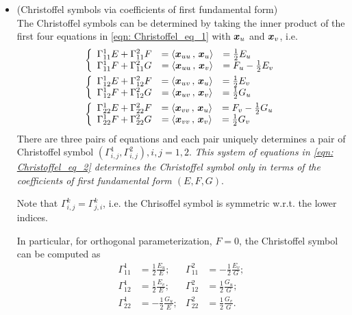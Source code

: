 \documentclass[11pt]{article}
\begin{document}
\begin{itemize}
\item (Christoffel symbols via coefficients of first fundamental form)\\
The Christoffel symbols can be determined by taking the inner product of the first four equations in \eqref{eqn: Christoffel_eq_1} with $\boldsymbol{x}_{u}$ and $\boldsymbol{x}_{v}$, i.e. 
\begin{align}
&\left\{ \begin{array}{ccl}
\Gamma_{11}^{1}E + \Gamma_{11}^{2}F &= \left\langle \boldsymbol{x}_{uu}\,,\, \boldsymbol{x}_{u} \right\rangle &= \frac{1}{2}E_{u} \\ 
\Gamma_{11}^{1}F + \Gamma_{11}^{2}G &= \left\langle \boldsymbol{x}_{uu}\,,\, \boldsymbol{x}_{v} \right\rangle &= F_{u} - \frac{1}{2}E_{v} 
\end{array} \right. \nonumber\\
&\left\{ \begin{array}{ccl}
\Gamma_{12}^{1}E + \Gamma_{12}^{2}F &= \left\langle \boldsymbol{x}_{uv}\,,\, \boldsymbol{x}_{u} \right\rangle &= \frac{1}{2}E_{v} \\ 
\Gamma_{12}^{1}F + \Gamma_{12}^{2}G &= \left\langle \boldsymbol{x}_{uv}\,,\, \boldsymbol{x}_{v} \right\rangle &= \frac{1}{2}G_{u}  
\end{array} \right. \nonumber\\
&\left\{ \begin{array}{ccl}
\Gamma_{22}^{1}E + \Gamma_{22}^{2}F &= \left\langle \boldsymbol{x}_{vv}\,,\, \boldsymbol{x}_{u} \right\rangle &=F_{v} - \frac{1}{2}G_{u}  \\ 
\Gamma_{22}^{1}F + \Gamma_{22}^{2}G &= \left\langle \boldsymbol{x}_{vv}\,,\, \boldsymbol{x}_{v} \right\rangle &= \frac{1}{2}G_{v}   
\end{array} \right. \label{eqn: Christoffel_eq_2}
\end{align}
There are three pairs of equations and each pair uniquely determines a pair of Christoffel symbol $(\Gamma_{i,j}^{1}, \Gamma_{i,j}^{2}), i,j=1,2$. \emph{This system of equations in \eqref{eqn: Christoffel_eq_2} determines the Christoffel symbol only in terms of the coefficients of first fundamental form $(E,F,G)$}.  

Note that $\Gamma_{i,j}^{k} = \Gamma_{j,i}^{k}$, i.e. the Chrisoffel symbol is symmetric w.r.t. the lower indices.

In particular, for orthogonal parameterization, $F=0$, the Christoffel symbol can be computed as
\begin{align*}
\Gamma_{11}^{1} &= \frac{1}{2}\frac{E_{u}}{E};  &
\Gamma_{11}^{2} &= -\frac{1}{2}\frac{E_{v}}{G};\\
\Gamma_{12}^{1} &= \frac{1}{2}\frac{E_{v}}{E};  &
\Gamma_{12}^{2} &= \frac{1}{2}\frac{G_{u}}{G};\\
\Gamma_{22}^{1} &= -\frac{1}{2}\frac{G_{u}}{E};  &
\Gamma_{22}^{2} &= \frac{1}{2}\frac{G_{v}}{G}.
\end{align*}
\\


\end{itemize}
\end{document}

